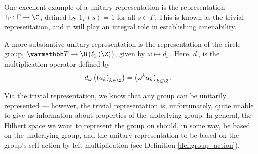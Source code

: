 \begin{example}
  One excellent example of a unitary representation is the representation $1_{\Gamma}\colon \Gamma\rightarrow \C$, defined by $1_{\Gamma}(s) = 1$ for all $s\in\Gamma$. This is known as the trivial representation, and it will play an integral role in establishing amenability.\newline

  A more substantive unitary representation is the representation of the circle group, $\mathbb{T}\rightarrow \B\left(\ell_2\left(\Z\right)\right)$, given by $\omega \mapsto d_{\omega}$. Here, $d_{\omega}$ is the multiplication operator defined by
  \begin{align*}
    d_{\omega}\left(\left(a_{k}\right)_{k\in\Z}\right) &= \left(\omega^k a_{k}\right)_{k\in\Z}.
  \end{align*}
\end{example}
Via the trivial representation, we know that any group can be unitarily represented --- however, the trivial representation is, unfortunately, quite unable to give us information about properties of the underlying group. In general, the Hilbert space we want to represent the group on should, in some way, be based on the underlying group, and the unitary representation to be based on the group's self-action by left-multiplication (see Definition \ref{def:group_action}).\newline


